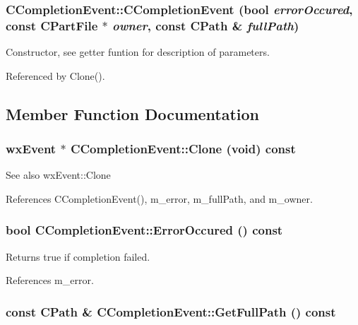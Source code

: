 \subsubsection[{CCompletionEvent}]{\setlength{\rightskip}{0pt plus 5cm}CCompletionEvent::CCompletionEvent (bool {\em errorOccured}, \/  const {\bf CPartFile} $\ast$ {\em owner}, \/  const {\bf CPath} \& {\em fullPath})}\label{classCCompletionEvent_a46a785b9b6748c21089552de1b5783fd}


Constructor, see getter funtion for description of parameters. 

Referenced by Clone().

\subsection{Member Function Documentation}
\subsubsection[{Clone}]{\setlength{\rightskip}{0pt plus 5cm}wxEvent $\ast$ CCompletionEvent::Clone (void) const\hspace{0.3cm}{\ttfamily  [virtual]}}\label{classCCompletionEvent_ab68d806593d6ddc8c1c3fcca8bbe1c58}
\begin{DoxySeeAlso}{See also}
wxEvent::Clone 
\end{DoxySeeAlso}


References CCompletionEvent(), m\_\-error, m\_\-fullPath, and m\_\-owner.
\subsubsection[{ErrorOccured}]{\setlength{\rightskip}{0pt plus 5cm}bool CCompletionEvent::ErrorOccured () const}\label{classCCompletionEvent_a72b8fc02a00384d3575258e93ca0e039}


Returns true if completion failed. 

References m\_\-error.
\subsubsection[{GetFullPath}]{\setlength{\rightskip}{0pt plus 5cm}const {\bf CPath} \& CCompletionEvent::GetFullPath () const}\label{classCCompletionEvent_add634b6ed9e57b07224dbc7338e3c5b6}


